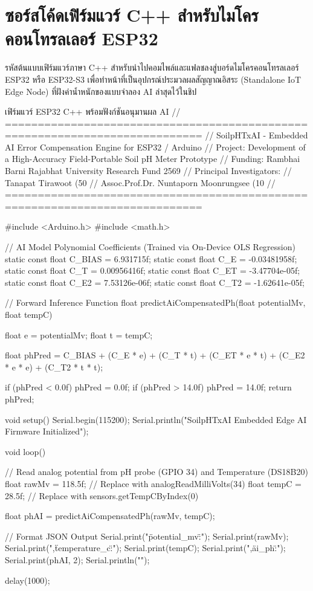 \chapter{ซอร์สโค้ดเฟิร์มแวร์ C++ สำหรับไมโครคอนโทรลเลอร์ ESP32}
\label{app:firmware}

รหัสต้นแบบเฟิร์มแวร์ภาษา C++ สำหรับนำไปคอมไพล์และแฟลชลงสู่บอร์ดไมโครคอนโทรลเลอร์ ESP32 หรือ ESP32-S3 เพื่อทำหน้าที่เป็นอุปกรณ์ประมวลผลสัญญาณอิสระ (Standalone IoT Edge Node) ที่ฝังค่าน้ำหนักของแบบจำลอง AI ล่าสุดไว้ในชิป

\begin{codebox}[language=C++]{เฟิร์มแวร์ ESP32 C++ พร้อมฟังก์ชันอนุมานผล AI}
// ============================================================================
// SoilpHTxAI - Embedded AI Error Compensation Engine for ESP32 / Arduino
// Project: Development of a High-Accuracy Field-Portable Soil pH Meter Prototype
// Funding: Rambhai Barni Rajabhat University Research Fund 2569
// Principal Investigators:
//   Tanapat Tirawoot (50%
//   Assoc.Prof.Dr. Nuntaporn Moonrungsee (10%
// ============================================================================

#include <Arduino.h>
#include <math.h>

// AI Model Polynomial Coefficients (Trained via On-Device OLS Regression)
static const float C_BIAS = 6.931715f;
static const float C_E    = -0.03481958f;
static const float C_T    = 0.00956416f;
static const float C_ET   = -3.47704e-05f;
static const float C_E2   = 7.53126e-06f;
static const float C_T2   = -1.62641e-05f;

// Forward Inference Function
float predictAiCompensatedPh(float potentialMv, float tempC) {
  float e = potentialMv;
  float t = tempC;
  
  float phPred = C_BIAS +
                 (C_E * e) +
                 (C_T * t) +
                 (C_ET * e * t) +
                 (C_E2 * e * e) +
                 (C_T2 * t * t);

  if (phPred < 0.0f) phPred = 0.0f;
  if (phPred > 14.0f) phPred = 14.0f;
  return phPred;
}

void setup() {
  Serial.begin(115200);
  Serial.println("SoilpHTxAI Embedded Edge AI Firmware Initialized");
}

void loop() {
  // Read analog potential from pH probe (GPIO 34) and Temperature (DS18B20)
  float rawMv = 118.5f; // Replace with analogReadMilliVolts(34)
  float tempC = 28.5f;  // Replace with sensors.getTempCByIndex(0)
  
  float phAI = predictAiCompensatedPh(rawMv, tempC);
  
  // Format JSON Output
  Serial.print("{\"potential_mv\":");
  Serial.print(rawMv);
  Serial.print(",\"temperature_c\":");
  Serial.print(tempC);
  Serial.print(",\"ai_ph\":");
  Serial.print(phAI, 2);
  Serial.println("}");
  
  delay(1000);
}
\end{codebox}

\clearpage
